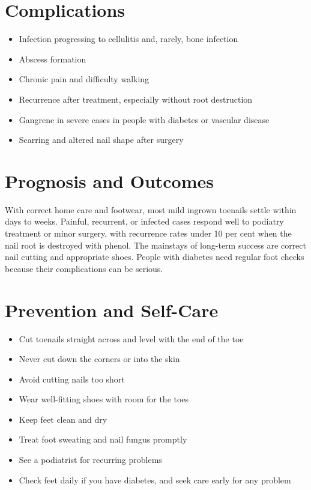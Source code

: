 \section*{Complications}
\begin{itemize}
    \item Infection progressing to cellulitis and, rarely, bone infection
    \item Abscess formation
    \item Chronic pain and difficulty walking
    \item Recurrence after treatment, especially without root destruction
    \item Gangrene in severe cases in people with diabetes or vascular disease
    \item Scarring and altered nail shape after surgery
\end{itemize}

\section*{Prognosis and Outcomes}
With correct home care and footwear, most mild ingrown toenails settle within days to weeks. Painful, recurrent, or infected cases respond well to podiatry treatment or minor surgery, with recurrence rates under 10 per cent when the nail root is destroyed with phenol. The mainstays of long-term success are correct nail cutting and appropriate shoes. People with diabetes need regular foot checks because their complications can be serious.

\section*{Prevention and Self-Care}
\begin{itemize}
    \item Cut toenails straight across and level with the end of the toe
    \item Never cut down the corners or into the skin
    \item Avoid cutting nails too short
    \item Wear well-fitting shoes with room for the toes
    \item Keep feet clean and dry
    \item Treat foot sweating and nail fungus promptly
    \item See a podiatrist for recurring problems
    \item Check feet daily if you have diabetes, and seek care early for any problem
\end{itemize}


